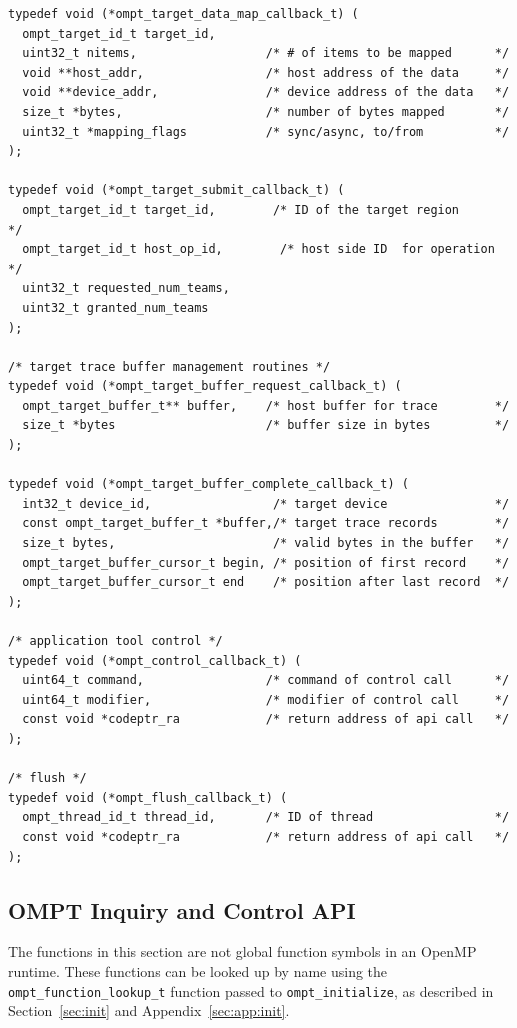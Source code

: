 \documentclass{article}
\begin{document}
{\begin{verbatim}
typedef void (*ompt_target_data_map_callback_t) (
  ompt_target_id_t target_id, 
  uint32_t nitems,                  /* # of items to be mapped      */
  void **host_addr,                 /* host address of the data     */
  void **device_addr,               /* device address of the data   */ 
  size_t *bytes,                    /* number of bytes mapped       */
  uint32_t *mapping_flags           /* sync/async, to/from          */
);

typedef void (*ompt_target_submit_callback_t) (
  ompt_target_id_t target_id, 	     /* ID of the target region      */
  ompt_target_id_t host_op_id,	      /* host side ID  for operation  */	
  uint32_t requested_num_teams,
  uint32_t granted_num_teams
);

/* target trace buffer management routines */
typedef void (*ompt_target_buffer_request_callback_t) (
  ompt_target_buffer_t** buffer,    /* host buffer for trace        */
  size_t *bytes                     /* buffer size in bytes         */
);
  
typedef void (*ompt_target_buffer_complete_callback_t) (
  int32_t device_id,                 /* target device               */
  const ompt_target_buffer_t *buffer,/* target trace records        */
  size_t bytes,                      /* valid bytes in the buffer   */
  ompt_target_buffer_cursor_t begin, /* position of first record    */
  ompt_target_buffer_cursor_t end    /* position after last record  */ 
);

/* application tool control */						   
typedef void (*ompt_control_callback_t) (
  uint64_t command,                 /* command of control call      */
  uint64_t modifier,                /* modifier of control call     */
  const void *codeptr_ra            /* return address of api call   */
);

/* flush */
typedef void (*ompt_flush_callback_t) (
  ompt_thread_id_t thread_id,       /* ID of thread                 */
  const void *codeptr_ra            /* return address of api call   */
);

\end{verbatim}


\clearpage
\subsection{OMPT Inquiry and Control API}

The functions in this section are not global function symbols in an OpenMP runtime. These functions can be looked up by name using the \verb|ompt_function_lookup_t| function passed to \verb|ompt_initialize|, as described in Section~\ref{sec:init} and Appendix~\ref{sec:app:init}.

}
\end{document}
